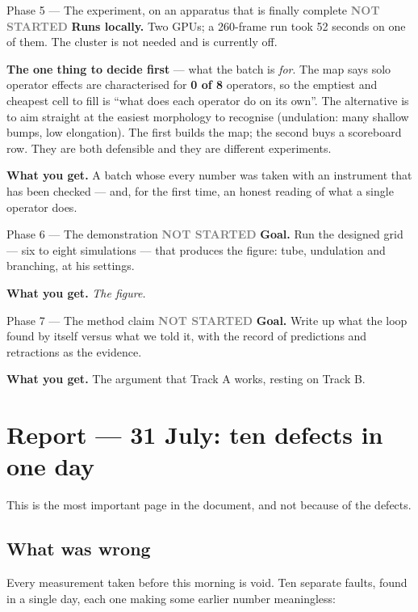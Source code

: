 \documentclass[11pt,a4paper]{article}
\newcommand{\todo}{\textcolor{grey}{\textbf{NOT STARTED}}}
\begin{document}
\begin{phasebox}{Phase 5 --- The experiment, on an apparatus that is finally complete \hfill \todo}
\textbf{Runs locally.} Two GPUs; a 260-frame run took 52 seconds on one of them. The cluster is not
needed and is currently off.

\textbf{The one thing to decide first} --- what the batch is \emph{for}. The map says solo operator
effects are characterised for \textbf{0 of 8} operators, so the emptiest and cheapest cell to fill
is ``what does each operator do on its own''. The alternative is to aim straight at the easiest
morphology to recognise (undulation: many shallow bumps, low elongation). The first builds the map;
the second buys a scoreboard row. They are both defensible and they are different experiments.

\textbf{What you get.} A batch whose every number was taken with an instrument that has been
checked --- and, for the first time, an honest reading of what a single operator does.
\end{phasebox}
\begin{phasebox}{Phase 6 --- The demonstration \hfill \todo}
\textbf{Goal.} Run the designed grid --- six to eight simulations --- that produces the figure:
tube, undulation and branching, at his settings.

\textbf{What you get.} \emph{The figure.}
\end{phasebox}
\begin{phasebox}{Phase 7 --- The method claim \hfill \todo}
\textbf{Goal.} Write up what the loop found by itself versus what we told it, with the record of
predictions and retractions as the evidence.

\textbf{What you get.} The argument that Track A works, resting on Track B.
\end{phasebox}

\section{Report --- 31 July: ten defects in one day}\label{sec:july31}

This is the most important page in the document, and not because of the defects.

\subsection{What was wrong}

Every measurement taken before this morning is void. Ten separate faults, found in a single day,
each one making some earlier number meaningless:
\end{document}
